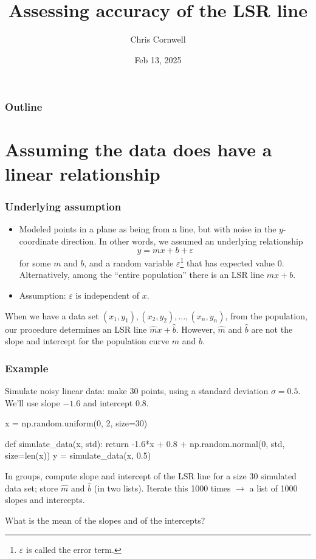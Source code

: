 \documentclass{beamer}
\author{Chris Cornwell}
\date{Feb 13, 2025}
\title{Assessing accuracy of the LSR line}
\newenvironment{codeblock}
    {\hfill\begin{beamerboxesrounded}[lower=codecol, width=0.8\textwidth]
    \medskip

    }
    { 
    \end{beamerboxesrounded}\hfill
    }
\theoremstyle{example}
\begin{document}
\begin{frame}
\titlepage
\end{frame}

\begin{frame}
\frametitle{Outline}
\tableofcontents
\end{frame}

\section{Assuming the data does have a linear relationship}

\begin{frame}
\frametitle{Underlying assumption}
\begin{itemize}
    \item Modeled points in a plane as being from a line, but with noise in the $y$-coordinate direction. In other words, we assumed an underlying relationship 
        \[y = mx + b + \varepsilon\]
    for some $m$ and $b$, and a random variable $\varepsilon$\footnote{$\varepsilon$ is called the error term.} that has expected value 0. Alternatively, among the ``entire population'' there is an LSR line $mx+b$. 
    \pause
    \item Assumption: $\varepsilon$ is independent of $x$.
\end{itemize}

When we have a data set $(x_1,y_1), (x_2,y_2), \ldots, (x_n,y_n)$, from the population, our procedure determines an LSR line $\hat{m}x + \hat{b}$. However, $\hat{m}$ and $\hat{b}$ are not the slope and intercept for the population curve $m$ and $b$.

\end{frame}

\begin{frame}[fragile]
\frametitle{Example}
Simulate noisy linear data: make 30 points, using a standard deviation $\sigma = 0.5$. We'll use slope $-1.6$ and intercept $0.8$.
\pause

\begin{codeblock}

\begin{python}
x = np.random.uniform(0, 2, size=30)

def simulate_data(x, std):
    return -1.6*x + 0.8 + np.random.normal(0, std, size=len(x))
y = simulate_data(x, 0.5)
\end{python}

\end{codeblock}

\pause
In groups, compute slope and intercept of the LSR line for a size 30 simulated data set; store $\hat{m}$ and $\hat{b}$ (in two lists). Iterate this 1000 times $\to$ a list of 1000 slopes and intercepts. 

\pause
What is the mean of the slopes and of the intercepts?

\end{frame}
\end{document}
